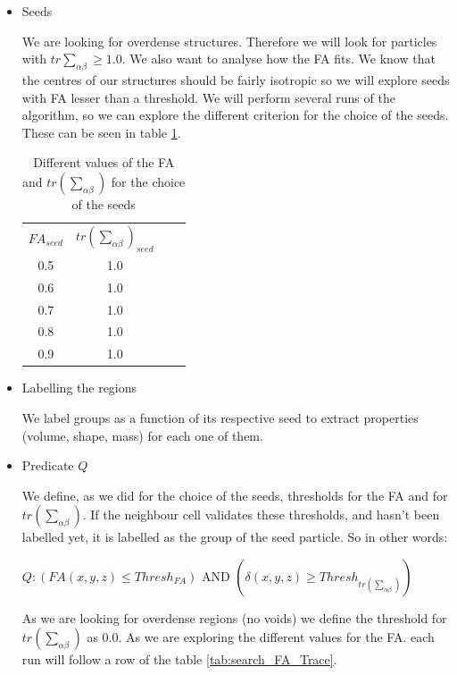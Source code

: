 \documentclass[12pt]{article}
\begin{document}
\begin{itemize}
    \item Seeds
\begin{par}
We are looking for overdense structures. Therefore we will look
for particles with $tr\sum_{\alpha \beta} \geq 1.0$.  We also want to analyse how
the FA fits. We know that the centres of our structures should be
fairly isotropic so we will explore seeds with FA lesser than a
threshold. We will perform several runs of the algorithm, so we
can explore the different criterion for the choice of the seeds.
These can be seen in table \ref{tab:seeds_FA_Trace}. 
\end{par}
 \begin{table}[ht]
    \centering
    \begin{tabular}{|c|c|c|c|}
        $FA_{seed}$ & $tr\left(\sum_{\alpha \beta}\right)_{seed}$ \\
        0.5 &  1.0 \\
        0.6 &  1.0 \\
        0.7 &  1.0 \\
        0.8 &  1.0 \\
        0.9 &  1.0 \\
    \end{tabular}
    \caption{Different values of the FA and $tr\left(\sum_{\alpha \beta}\right)$ for the choice of the seeds}
    \label{tab:seeds_FA_Trace}
\end{table}
\FloatBarrier

\item Labelling the regions
\begin{par}
We label groups as a function of its respective
 seed to extract properties (volume, shape, mass)
  for each one of them.
\end{par}

\item Predicate $Q$

\begin{par}
We define, as we did for the
choice of the seeds, thresholds for the FA and for $tr\left(\sum_{\alpha \beta}\right)$. If
the neighbour cell validates these thresholds, and hasn't been
labelled yet, it is labelled as the group of the seed particle. So
in other words: \\

\begin{center}
$Q: \left( FA (x,y,z) \leq Thresh_{FA} \right)$ AND
$\left( \delta (x,y,z) \geq Thresh_{tr\left(\sum_{\alpha \beta}\right)} \right)$ 
\end{center}
As we are looking for overdense regions (no voids) we define the
threshold for $tr\left(\sum_{\alpha \beta}\right)$ as 0.0. As we are exploring the different
values for the FA. each run will follow a row of the table \ref{tab:search_FA_Trace}.
\end{par}


\end{itemize}
\end{document}
